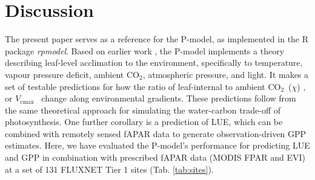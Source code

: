 \documentclass{myreport}
\newcommand{\coo}{CO$_2$}
\newcommand{\vcmax}{$V_{\text{cmax}}$}
\begin{document}

\section{Discussion}
\label{sec:discussion}

The present paper serves as a reference for the P-model, as implemented in the R package \textit{rpmodel}. Based on earlier work \citep{wright03, prentice14ecollett, wang17natpl}, the P-model implements a theory describing leaf-level acclimation to the environment, specifically to temperature, vapour pressure deficit, ambient \coo , atmospheric pressure, and light. It makes a set of testable predictions for how the ratio of leaf-internal to ambient \coo\ ($\chi$) \citep{wang17natpl}, or \vcmax\ \citep{smith19ecollett} change along environmental gradients. These predictions follow from the same theoretical approach for simulating the water-carbon trade-off of photosynthesis. One further corollary is a prediction of LUE, which can be combined with remotely sensed fAPAR data to generate observation-driven GPP estimates. Here, we have evaluated the P-model's performance for predicting LUE and GPP in combination with prescribed fAPAR data (MODIS FPAR and EVI) at a set of 131 FLUXNET Tier 1 sites (Tab. \ref{tab:sites}).
\end{document}
